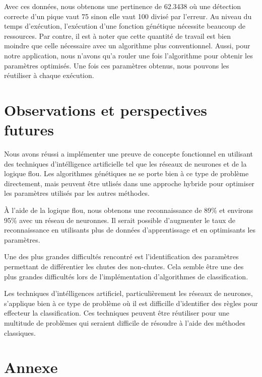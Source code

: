 \documentclass[12pt,letterpaper]{article}
\begin{document}
Avec ces données, nous obtenons une pertinence de 62.3438 où une détection correcte d'un pique vaut 75 sinon elle vaut 100 divisé par l'erreur.
Au niveau du temps d'exécution, l'exécution d'une fonction génétique nécessite beaucoup de ressources. Par contre, il est à noter que
cette quantité de travail est bien moindre que celle nécessaire avec un algorithme plus conventionnel. Aussi, pour notre application, nous n'avons
qu'a rouler une fois l'algorithme pour obtenir les paramètres optimisés. Une fois ces paramètres obtenus, nous pouvons les réutiliser à chaque exécution.

\section{Observations et perspectives futures}

Nous avons réussi a implémenter une preuve de concepte fonctionnel en utilisant des techniques d'intélligence artificielle tel que les réseaux de neurones et de la logique flou. Les algorithmes génétiques ne se porte bien à ce type de problème directement, mais peuvent être utlisés dans une approche hybride pour optimiser les paramètres utilisés par les autres méthodes.

À l'aide de la logique flou, nous obtenons une reconnaissance de 89\% et environs 95\% avec un réseau de neuronnes. Il serait possible d'augmenter le taux de reconnaissance en utilisants plus de données d'apprentissage et en optimisants les paramètres.

Une des plus grandes difficultés rencontré est l'identification des paramètres permettant de différentier les chutes des non-chutes. Cela semble être une des plus grandes difficultés lors de l'implémentation d'algorithmes de classification.

Les techniques d'intélligences artificiel, particulièrement les réseaux de neurones, s'applique bien à ce type de problème où il est difficille d'identifier des règles pour effecteur la classification. Ces techniques peuvent être réutiliser pour une multitude de problèmes qui seraient difficile de résoudre à l'aide des méthodes classiques.

\pagebreak
\section{Annexe}
\end{document}
